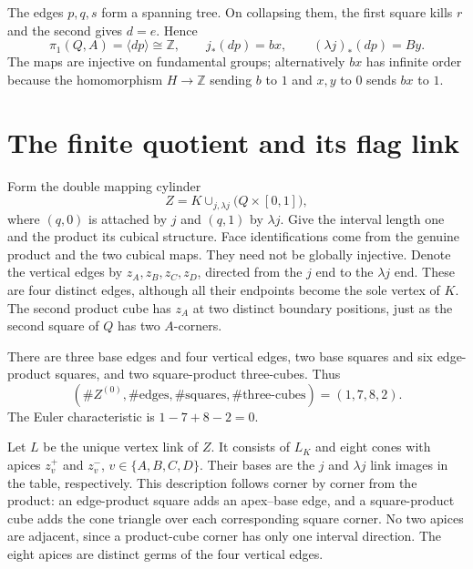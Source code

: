 \documentclass[11pt]{article}
\begin{document}
The edges $p,q,s$ form a spanning tree. On collapsing them, the first
square kills $r$ and the second gives $d=e$. Hence
\begin{equation}\label{eq:cyclic}
 \pi_1(Q,A)=\langle dp\rangle\cong\mathbb Z,
 \qquad j_*(dp)=bx,
 \qquad (\lambda j)_*(dp)=By.
\end{equation}
The maps are injective on fundamental groups; alternatively $bx$ has
infinite order because the homomorphism $H\to\mathbb Z$ sending $b$ to
$1$ and $x,y$ to $0$ sends $bx$ to $1$.

\section{The finite quotient and its flag link}

Form the double mapping cylinder
\begin{equation}\label{eq:Z}
 Z=K\cup_{j,\lambda j}\bigl(Q\times[0,1]\bigr),
\end{equation}
where $(q,0)$ is attached by $j$ and $(q,1)$ by $\lambda j$. Give the
interval length one and the product its cubical structure. Face
identifications come from the genuine product and the two cubical maps.
They need not be globally injective. Denote the vertical edges by
$z_A,z_B,z_C,z_D$, directed from the $j$ end to the $\lambda j$ end. These
are four distinct edges, although all their endpoints become the sole
vertex of $K$. The second product cube has $z_A$ at two distinct boundary
positions, just as the second square of $Q$ has two $A$-corners.

There are three base edges and four vertical edges, two base squares and
six edge-product squares, and two square-product three-cubes. Thus
\begin{equation}\label{eq:counts}
 (\#Z^{(0)},\#\text{edges},\#\text{squares},\#\text{three-cubes})=(1,7,8,2).
\end{equation}
The Euler characteristic is $1-7+8-2=0$.

Let $L$ be the unique vertex link of $Z$. It consists of $L_K$ and eight
cones with apices $z_v^+$ and $z_v^-$, $v\in\{A,B,C,D\}$. Their bases
are the $j$ and $\lambda j$ link images in the table, respectively. This
description follows corner by corner from the product: an edge-product
square adds an apex--base edge, and a square-product cube adds the cone
triangle over each corresponding square corner. No two apices are
adjacent, since a product-cube corner has only one interval direction.
The eight apices are distinct germs of the four vertical edges.
\end{document}
